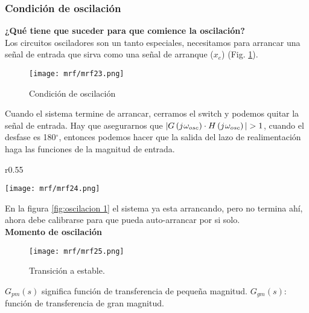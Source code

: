 \documentclass[
	12pt, %
	fleqn, %
	a4paper, %
	oneside, %
]{LegrandOrangeBook}
\begin{document}
\subsubsection{Condición de oscilación}
\textbf{¿Qué tiene que suceder para que comience la oscilación?}\\
Los circuitos osciladores son un tanto especiales, necesitamos para arrancar una señal de entrada que sirva como una señal de arranque ($x_e$) (Fig. \ref{fig:condi osci}).
\begin{figure}[]
\centering
\texttt{[image: mrf/mrf23.png]}
\caption{Condición de oscilación}
\label{fig:condi osci}
\end{figure}
Cuando el sistema termine de arrancar, cerramos el switch y podemos quitar la señal de entrada. Hay que asegurarnos que $|G\parentesis{\iu\omega_{osc}}\cdot H\parentesis{\iu\omega_{osc}}|>1$, cuando el desfase es 180$^{\circ}$, entonces podemos hacer que la salida del
lazo de realimentación haga las funciones de la magnitud de entrada.
\begin{wrapfigure}{r}{0.55\linewidth}
  \begin{center}
    \texttt{[image: mrf/mrf24.png]}
  \end{center}
  \caption{Oscilación.}
  \label{fig:oscilacion 1}
\end{wrapfigure}
En la figura \ref{fig:oscilacion 1} el sistema ya esta arrancando, pero no termina ahí, ahora debe calibrarse para que pueda auto-arrancar por si solo.\\\textbf{Momento de oscilación}
\begin{figure}[H]
\centering
\texttt{[image: mrf/mrf25.png]}
\caption{Transición a estable.}
\end{figure}
\begin{notation}
$G_{pm}(s)$ significa función de transferencia de pequeña magnitud. $G_{gm}(s)$: función de transferencia de gran magnitud.
\end{notation}
\end{document}
